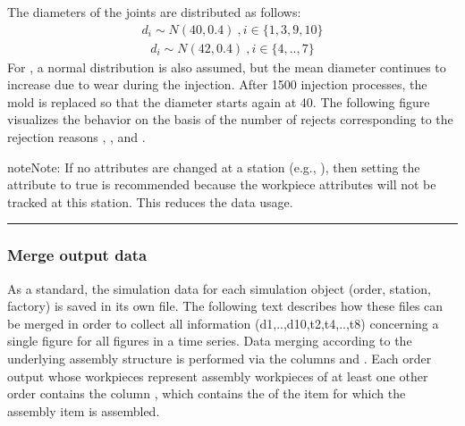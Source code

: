 \documentclass[letterpaper,10pt,english]{sphinxmanual}
\begin{document}
\sphinxAtStartPar
The diameters of the joints are distributed as follows:
\begin{equation*}
\begin{split}d_i \sim N(40,0.4)\ ,i\in\lbrace1,3,9,10\rbrace\end{split}
\end{equation*}\begin{equation*}
\begin{split}d_i \sim N(42,0.4)\ ,i\in\lbrace4,..,7\rbrace\end{split}
\end{equation*}
\sphinxAtStartPar
For , a normal distribution is also assumed, but the mean diameter continues to increase due to wear during the
injection. After 1500 injection processes, the mold is replaced so that the diameter starts again at 40. The following
figure visualizes the behavior on the basis of the number of rejects corresponding to the rejection reasons , ,
and .


\begin{sphinxadmonition}{note}{Note:}
\sphinxAtStartPar
If no attributes are changed at a station (e.g., ), then setting the attribute  to true
is recommended because the workpiece attributes will not be tracked at this station. This reduces the data usage.
\end{sphinxadmonition}


\bigskip\hrule\bigskip



\subsubsection{Merge output data}
\label{\detokenize{source/Examples/example04:merge-output-data}}\label{\detokenize{source/Examples/example04:merge}}
\sphinxAtStartPar
As a standard, the simulation data for each simulation object (order, station, factory) is saved in its own file. The
following text describes how these files can be merged in order to collect all information (d1,..,d10,t2,t4,..,t8)
concerning a single figure for all figures in a time series. Data merging according to the underlying assembly structure
is performed via the columns  and . Each order output whose workpieces represent assembly workpieces of
at least one other order contains the column , which contains the  of the item for which the assembly
item is assembled.
\end{document}
